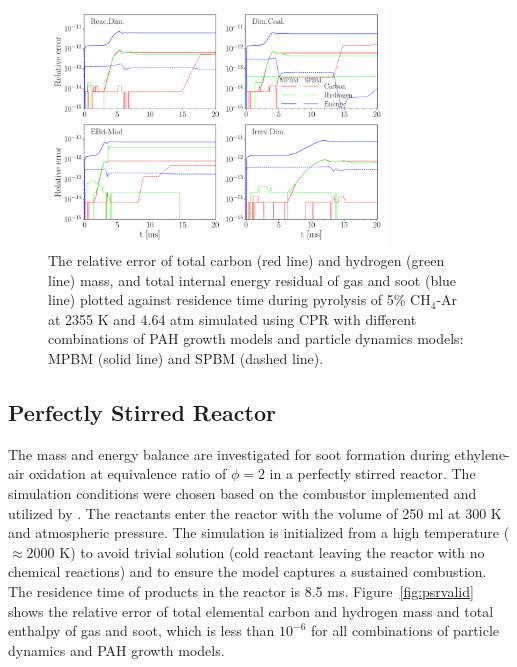 \begin{figure}[H]
	\centering
	\includegraphics[width=0.8\textwidth]{Figures/Results/Validation/CPR/relerr_cpr.pdf}
	\caption{The relative error of total carbon (red line) and hydrogen (green line) mass, and total internal energy residual of gas and soot (blue line) plotted against residence time during pyrolysis of 5\% $\mathrm{CH_4}$-Ar at 2355 K and 4.64 atm simulated using CPR with different combinations of PAH growth models and particle dynamics models: MPBM (solid line) and SPBM (dashed line).}
	\label{fig:cprvalid}
\end{figure}

\subsection{Perfectly Stirred Reactor}
\label{sec:psrvalid}
The mass and energy balance are investigated for soot formation during ethylene-air oxidation at equivalence ratio of $\phi=2$ in a perfectly stirred reactor. The simulation conditions were chosen based on the combustor implemented and utilized by \citet{stouffer2002combustion}. The reactants enter the reactor with the volume of 250 ml at 300 K and atmospheric pressure. The simulation is initialized from a high temperature ($\approx$2000 K) to avoid trivial solution (cold reactant leaving the reactor with no chemical reactions) and to ensure the model captures a sustained combustion. The residence time of products in the reactor is 8.5 ms. Figure~\ref{fig:psrvalid} shows the relative error of total elemental carbon and hydrogen mass and total enthalpy of gas and soot, which is less than $10^{-6}$ for all combinations of particle dynamics and PAH growth models.

